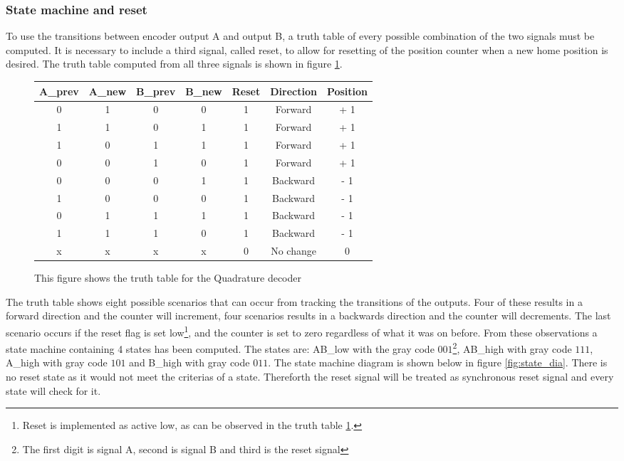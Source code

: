 \documentclass[../../../main]{subfiles}
\begin{document}
\subsubsection{State machine and reset}
To use the transitions between encoder output A and output B, a truth table of every possible combination of the two signals must be computed. It is necessary to include a third signal, called reset, to allow for resetting of the position counter when a new home position is desired. The truth table computed from all three signals is shown in figure \ref{fig:truth_table}.
\begin{figure}[H]
  \begin{tabular}{|c | c | c | c | c | c |c|}
  \hline
   A\_prev & A\_new & B\_prev & B\_new & Reset & Direction & Position \\
   \hline
   0 & 1 & 0 & 0 & 1 & Forward & + 1 \\
   1 & 1 & 0 & 1 & 1 & Forward & + 1 \\
   1 & 0 & 1 & 1 & 1 & Forward & + 1 \\
   0 & 0 & 1 & 0 & 1 & Forward & + 1 \\
   0 & 0 & 0 & 1 & 1 & Backward & - 1 \\
   1 & 0 & 0 & 0 & 1 & Backward & - 1 \\
   0 & 1 & 1 & 1 & 1 & Backward & - 1 \\
   1 & 1 & 1 & 0 & 1 & Backward & - 1 \\
   x & x & x & x & 0 & No change &  0 \\
   \hline
  \end{tabular}
  \caption{This figure shows the truth table for the Quadrature decoder}
  \label{fig:truth_table}
\end{figure}
The truth table shows eight possible scenarios that can occur from tracking the transitions of the outputs. Four of these results in a forward direction and the counter will increment, four scenarios results in a backwards direction and the counter will decrements. The last scenario occurs if the reset flag is set low\footnote{Reset is implemented as active low, as can be observed in the truth table \ref{fig:truth_table}.}, and the counter is set to zero regardless of what it was on before. From these observations a state machine containing 4 states has been computed. The states are: AB\_low with the gray code $001$\footnote{The first digit is signal A, second is signal B and third is the reset signal}, AB\_high with gray code $111$, A\_high with gray code $101$ and B\_high with gray code $011$. The state machine diagram is shown below in figure \ref{fig:state_dia}. There is no reset state as it would not meet the criterias of a state. Thereforth the reset signal will be treated as synchronous reset signal and every state will check for it. \\
\end{document}
